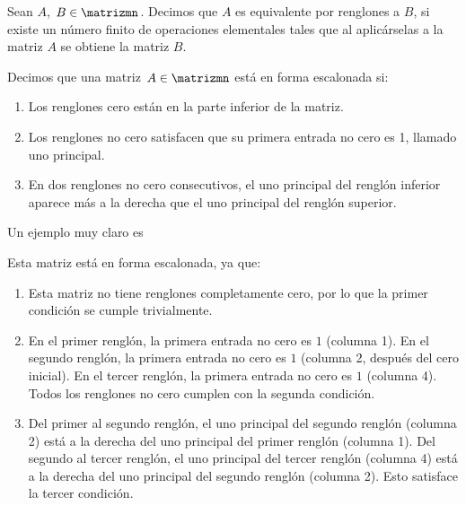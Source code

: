 \begin{definicion}{}{}
    Sean $A$, $B \in \matrizmn$. Decimos que $A$ es equivalente por renglones a $B$, si existe un número finito de operaciones elementales tales que al aplicárselas a la matriz $A$ se obtiene la matriz $B$.
\end{definicion}

\begin{definicion}{}{}
    Decimos que una matriz $A \in \matrizmn$ está en forma escalonada si:
    \begin{enumerate}[label=\roman*), topsep=6pt, itemsep=0pt]
        \item Los renglones cero están en la parte inferior de la matriz.
        \item Los renglones no cero satisfacen que su primera entrada no cero es 1, llamado uno principal.
        \item En dos renglones no cero consecutivos, el uno principal del renglón inferior aparece más a la derecha que el uno principal del renglón superior.
    \end{enumerate}
\end{definicion}

\begin{examplebox}{}{}
    Un ejemplo muy claro es
    \begin{matrizn}
    \end{matrizn}
    Esta matriz está en forma escalonada, ya que:
    \begin{enumerate}[label=\roman*), topsep=6pt, itemsep=0pt]
        \item Esta matriz no tiene renglones completamente cero, por lo que la primer condición se cumple trivialmente.
        \item En el primer renglón, la primera entrada no cero es $1$ (columna 1). En el segundo renglón, la primera entrada no cero es $1$ (columna 2, después del cero inicial). En el tercer renglón, la primera entrada no cero es $1$ (columna 4). Todos los renglones no cero cumplen con la segunda condición.
        \item Del primer al segundo renglón, el uno principal del segundo renglón (columna 2) está a la derecha del uno principal del primer renglón (columna 1). Del segundo al tercer renglón, el uno principal del tercer renglón (columna 4) está a la derecha del uno principal del segundo renglón (columna 2). Esto satisface la tercer condición. 
    \end{enumerate}
\end{examplebox}

